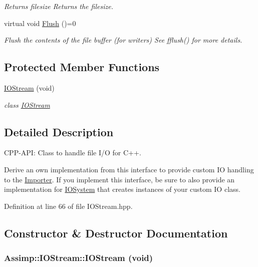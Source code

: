 \begin{CompactItemize}
\begin{CompactList}\small\item\em Returns filesize Returns the filesize. \item\end{CompactList}\item 
\hypertarget{class_assimp_1_1_i_o_stream_7c19952446ece90924b246f087417899}{
virtual void \hyperlink{class_assimp_1_1_i_o_stream_7c19952446ece90924b246f087417899}{Flush} ()=0}
\label{class_assimp_1_1_i_o_stream_7c19952446ece90924b246f087417899}

\begin{CompactList}\small\item\em Flush the contents of the file buffer (for writers) See fflush() for more details. \item\end{CompactList}\end{CompactItemize}
\subsection*{Protected Member Functions}
\begin{CompactItemize}
\item 
\hyperlink{class_assimp_1_1_i_o_stream_f5ae78123b6c6f7afc31b2a52dc9192e}{IOStream} (void)
\begin{CompactList}\small\item\em class \hyperlink{class_assimp_1_1_i_o_stream}{IOStream} \item\end{CompactList}\end{CompactItemize}


\subsection{Detailed Description}
CPP-API: Class to handle file I/O for C++. 

Derive an own implementation from this interface to provide custom IO handling to the \hyperlink{class_assimp_1_1_importer}{Importer}. If you implement this interface, be sure to also provide an implementation for \hyperlink{class_assimp_1_1_i_o_system}{IOSystem} that creates instances of your custom IO class. 

Definition at line 66 of file IOStream.hpp.

\subsection{Constructor \& Destructor Documentation}
\hypertarget{class_assimp_1_1_i_o_stream_f5ae78123b6c6f7afc31b2a52dc9192e}{
\subsubsection[IOStream]{\setlength{\rightskip}{0pt plus 5cm}Assimp::IOStream::IOStream (void)}}
\label{class_assimp_1_1_i_o_stream_f5ae78123b6c6f7afc31b2a52dc9192e}


